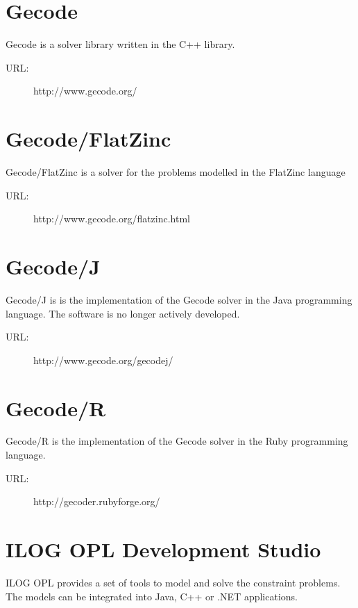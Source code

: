 \section*{Gecode}
Gecode is a solver library written in the C++ library. 

\begin{description}
	\item[URL:] http://www.gecode.org/
\end{description}  

\section*{Gecode/FlatZinc}
Gecode/FlatZinc is a solver for the problems modelled in the FlatZinc language  

\begin{description}
	\item[URL:] http://www.gecode.org/flatzinc.html
\end{description}  

\section*{Gecode/J}
Gecode/J is is the implementation of the Gecode solver in the Java programming language.
The software is no longer actively developed. 

\begin{description}
	\item[URL:] http://www.gecode.org/gecodej/
\end{description}  

\section*{Gecode/R}
Gecode/R is the implementation of the Gecode solver in the Ruby programming language. 

\begin{description}
	\item[URL:] http://gecoder.rubyforge.org/
\end{description}  

\section*{ILOG OPL Development Studio}
ILOG OPL provides a set of tools to model and solve the constraint problems. The
models can be integrated into Java, C++ or .NET applications.

